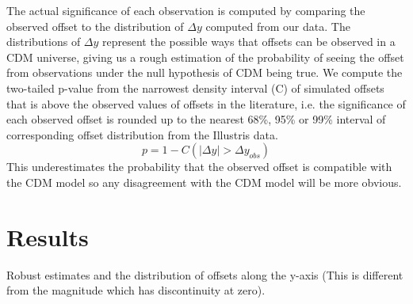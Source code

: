 The actual significance of each observation is computed by comparing the
observed offset to the distribution of $\Delta y$ computed from our data. 
The distributions of $\Delta y$ represent the possible ways that offsets can be observed in a CDM
universe, giving us a rough estimation of the probability 
of seeing the offset from observations under the null hypothesis of CDM 
being true. 
We compute the two-tailed 
p-value from the narrowest density interval (C) of simulated offsets 
that is above the observed values of offsets in the literature, 
i.e. the significance of each observed offset is rounded up to the nearest 68\%, 95\% or 99\%
interval of corresponding offset distribution from the Illustris data. 
\begin{equation}
	p = 1 - C(|\Delta y| > \Delta y_{obs})
\end{equation}
This underestimates the probability that the
observed offset is compatible with the CDM model so
any disagreement with the CDM model will be more obvious. 

 
\section{Results} 
\label{sec:results}

\begin{table*}
	\begin{center}
		\caption{Robust estimates and the distribution of offsets along the y-axis
			(This is different from the magnitude which has discontinuity at zero).
		\label{tab:p_val_table}
	}
	
	\end{center}
\end{table*}

